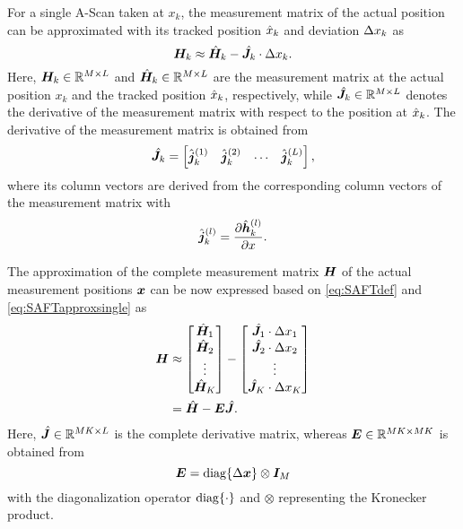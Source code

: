 For a single A-Scan taken at $x_{k}$, the measurement matrix of the actual position can be approximated with its tracked position $\hat{x}_{k}$ and deviation $\Delta x_{k}$ as
\begin{equation} \label{eq:SAFTapproxsingle}
	\SAFT_{k} \approx \SAFThat_{k} - \SAFTdothat_{k} \cdot \xdelta{k}.
\end{equation}
Here, $\bm{H}_{k} \in {\mathbb{R}}^{M \times L}$ and $\hat{\bm{H}}_{k} \in {\mathbb{R}}^{M \times L}$ are the measurement matrix at the actual position $x_{k}$ and the tracked position $\hat{x}_{k}$, respectively, while $\hat{\bm{J}}_{k} \in {\mathbb{R}}^{M \times L}$ denotes the derivative of the measurement matrix with respect to the position at $\hat{x}_{k}$. The derivative of the measurement matrix is obtained from 
\begin{equation} \label{eq:SAFTderivsingle}
	\SAFTdothat_{k} = \begin{bmatrix} \SAFTdothatcol{k}{1} & \SAFTdothatcol{k}{2} & \cdots & \SAFTdothatcol{k}{\LL} \end{bmatrix}, 
\end{equation}
where its column vectors are derived from the corresponding column vectors of the measurement matrix with
\begin{equation}
	\hat{\bm{j}}_{k}^{(l)} = \frac{\partial \hat{\bm{h}}_{k}^{(l)}}{\partial x}.
\end{equation}

The approximation of the complete measurement matrix $\bm{H}$ of the actual measurement positions $\bm{x}$ can be now expressed based on \eqref{eq:SAFTdef} and \eqref{eq:SAFTapproxsingle} as
\begin{align} \label{eq:SAFTapprox}
	\SAFT 
	& \approx
	\begin{bmatrix} 
		\SAFThat_{1} \\ \SAFThat_{2} \\ \vdots \\ \SAFThat_{\K} 
	\end{bmatrix} -
	\begin{bmatrix} 
		\SAFTdothat_{1} \cdot \xdelta{1}\\ \SAFTdothat_{2} \cdot \xdelta{2}\\ \vdots \\ \SAFTdothat_{\K} \cdot \xdelta{\K} 
	\end{bmatrix} \\
	& =
	\SAFThat - \Error \SAFTdothat. \nonumber
\end{align}
Here, $\hat{\bm{J}} \in {\mathbb{R}}^{M K \times L}$ is the complete derivative matrix, whereas $\bm{E} \in {\mathbb{R}}^{M K \times MK}$ is obtained from
\begin{equation} \label{eq:ErrorMat}
	\Error = \ErrorDef
\end{equation}
with the diagonalization operator $\operatorname{diag} \{ \cdot \}$ and $\otimes$ representing the Kronecker product.

